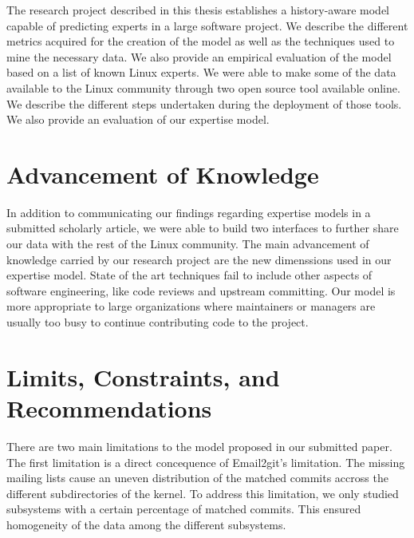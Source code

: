 \label{sec:Conclusion}


The research project described in this thesis establishes a history-aware model capable of predicting experts in a large software project. We describe the different metrics acquired for the creation of the model as well as the techniques used to mine the necessary data. We also provide an empirical evaluation of the model based on a list of known Linux experts. We were able to make some of the data available to the Linux community through two open source tool available online. We describe the different steps undertaken during the deployment of those tools. We also provide an evaluation of our expertise model.


\section{Advancement of Knowledge}


In addition to communicating our findings regarding expertise models in a submitted scholarly article, we were able to build two interfaces to further share our data with the rest of the Linux community. The main advancement of knowledge carried by our research project are the new dimenssions used in our expertise model. State of the art techniques fail to include other aspects of software engineering, like code reviews and upstream committing. Our model is more appropriate to large organizations where maintainers or managers are usually too busy to continue contributing code to the project. 

\section{Limits, Constraints, and Recommendations}







There are two main limitations to the model proposed in our submitted paper. The first limitation is a direct concequence of Email2git's limitation. The missing mailing lists cause an uneven distribution of the matched commits accross the different subdirectories of the kernel. To address this limitation, we only studied subsystems with a certain percentage of matched commits. This ensured homogeneity of the data among the different subsystems. 

